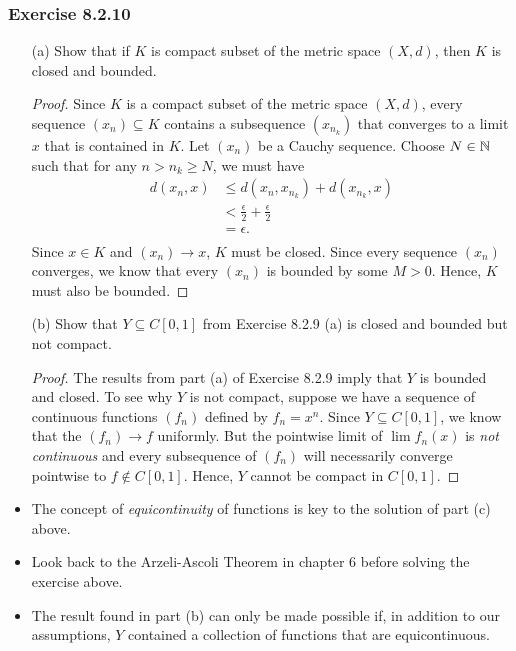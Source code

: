 \subsubsection{Exercise 8.2.10} 
\begin{enumerate}
    \item[(a)] Show that if \( K  \) is compact subset of the metric space \( (X,d)  \), then \( K  \) is closed and bounded.       
        \begin{proof}
        Since \( K  \) is a compact subset of the metric space \( (X,d) \), every sequence \( (x_{n}) \subseteq K  \) contains a subsequence \( (x_{n_{k }})  \) that converges to a limit \( x  \) that is contained in \( K  \). Let \( (x_{n}) \) be a Cauchy sequence. Choose \( N \in \mathbb{N}  \) such that for any \( n > n_{k } \geq N  \), we must have 
        \begin{align*}
            d(x_{n}, x ) &\leq d(x_{n}, x_{n_{k }}) + d(x_{n_{k }}, x)  \\
                         &< \frac{ \epsilon  }{ 2  } + \frac{ \epsilon  }{ 2 } \\ 
                         &= \epsilon.\\
        \end{align*}
        Since \( x \in K  \) and \( (x_{n}) \to x  \), \( K  \) must be closed. Since every sequence \( (x_{n})   \) converges, we know that every \( (x_{n})  \) is bounded by some \( M > 0  \). Hence, \( K  \) must also be bounded.
        \end{proof}
    \item[(b)] Show that \( Y \subseteq C[0,1]  \) from Exercise 8.2.9 (a) is closed and bounded but not compact.
        \begin{proof}
            The results from part (a) of Exercise 8.2.9 imply that \( Y  \) is bounded and closed. To see why \( Y  \) is not compact, suppose we have a sequence of continuous functions \( (f_{n}) \) defined by \( f_{n} = x^{n} \). Since \( Y \subseteq C[0,1] \), we know that the \( (f_{n})  \to f \) uniformly. But the pointwise limit of \( \lim  f_{n}(x) \) is \textit{not continuous} and every subsequence of \( (f_{n}) \) will necessarily converge pointwise to \( f  \notin C[0,1] \). Hence, \( Y  \) cannot be compact in \( C[0,1] \). 
        \end{proof}
\end{enumerate}

\begin{itemize}
    \item The concept of \textit{equicontinuity} of functions is key to the solution of part (c) above.
    \item Look back to the Arzeli-Ascoli Theorem in chapter 6 before solving the exercise above.
    \item The result found in part (b) can only be made possible if, in addition to our assumptions, \( Y  \) contained a collection of functions that are equicontinuous.
\end{itemize}




